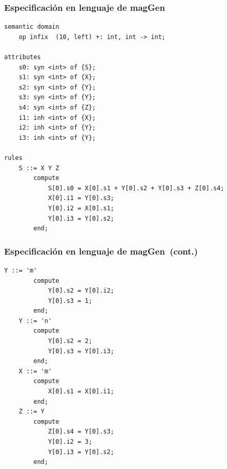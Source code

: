\documentclass[10pt, xcolor=table]{beamer}
\newcommand{\maggen}{\textbf{magGen}}
\begin{document}
\begin{frame}[fragile]
\frametitle{Especificación en lenguaje de \maggen}

\begin{lstlisting}[basicstyle=\scriptsize, language=specmag, linewidth=10cm]
semantic domain
    op infix  (10, left) +: int, int -> int;

attributes
    s0: syn <int> of {S};
    s1: syn <int> of {X};
    s2: syn <int> of {Y};
    s3: syn <int> of {Y};
    s4: syn <int> of {Z};
    i1: inh <int> of {X};
    i2: inh <int> of {Y};
    i3: inh <int> of {Y};

rules
    S ::= X Y Z
        compute
            S[0].s0 = X[0].s1 + Y[0].s2 + Y[0].s3 + Z[0].s4;
            X[0].i1 = Y[0].s3;
            Y[0].i2 = X[0].s1;
            Y[0].i3 = Y[0].s2;
        end;
\end{lstlisting}
\end{frame}

\begin{frame}[fragile]
\frametitle{Especificación en lenguaje de \maggen\ (cont.)}

\begin{lstlisting}[basicstyle=\scriptsize, language=specmag, linewidth=10cm]
    Y ::= 'm'
        compute
            Y[0].s2 = Y[0].i2;
            Y[0].s3 = 1;
        end;
    Y ::= 'n'
        compute
            Y[0].s2 = 2;
            Y[0].s3 = Y[0].i3;
        end;
    X ::= 'm'
        compute
            X[0].s1 = X[0].i1;
        end;
    Z ::= Y
        compute
            Z[0].s4 = Y[0].s3;
            Y[0].i2 = 3;
            Y[0].i3 = Y[0].s2;
        end;


\end{lstlisting}

\end{frame}
\end{document}
